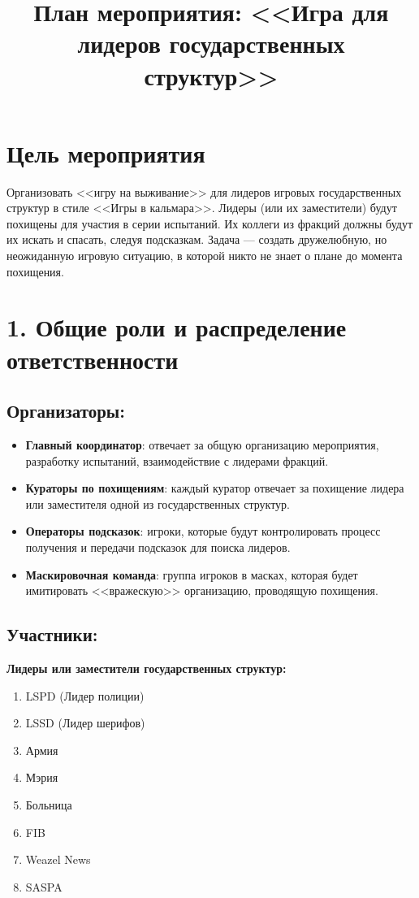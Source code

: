 \documentclass[12pt]{article}
\title{План мероприятия: <<Игра для лидеров государственных структур>>}
\author{}
\date{}
\begin{document}
\maketitle

\section*{Цель мероприятия}

Организовать <<игру на выживание>> для лидеров игровых государственных структур в стиле <<Игры в кальмара>>. Лидеры (или их заместители) будут похищены для участия в серии испытаний. Их коллеги из фракций должны будут их искать и спасать, следуя подсказкам. Задача — создать дружелюбную, но неожиданную игровую ситуацию, в которой никто не знает о плане до момента похищения.

\section*{1. Общие роли и распределение ответственности}

\subsection*{Организаторы:}
\begin{itemize}
    \item \textbf{Главный координатор}: отвечает за общую организацию мероприятия, разработку испытаний, взаимодействие с лидерами фракций.
    \item \textbf{Кураторы по похищениям}: каждый куратор отвечает за похищение лидера или заместителя одной из государственных структур.
    \item \textbf{Операторы подсказок}: игроки, которые будут контролировать процесс получения и передачи подсказок для поиска лидеров.
    \item \textbf{Маскировочная команда}: группа игроков в масках, которая будет имитировать <<вражескую>> организацию, проводящую похищения.
\end{itemize}

\subsection*{Участники:}
\textbf{Лидеры или заместители государственных структур:}
\begin{enumerate}
    \item LSPD (Лидер полиции)
    \item LSSD (Лидер шерифов)
    \item Армия
    \item Мэрия
    \item Больница
    \item FIB
    \item Weazel News
    \item SASPA
\end{enumerate}
\end{document}
